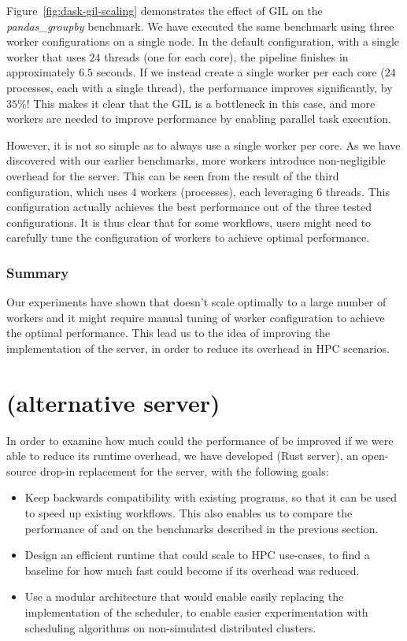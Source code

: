 Figure~\ref{fig:dask-gil-scaling} demonstrates the effect of GIL on the
\emph{pandas\_groupby} benchmark. We have executed the same benchmark using three
\dask{} worker configurations on a single node. In the default configuration,
with a single worker that uses $24$ threads (one for each core), the pipeline
finishes in approximately $6.5$ seconds. If we instead create a single worker
per each core ($24$ processes, each with a single thread), the performance
improves significantly, by $35\%$! This makes it clear that the GIL is a
bottleneck in this case, and more \dask{} workers are needed to improve
performance by enabling parallel task execution.

However, it is not so simple as to always use a single \dask{} worker per core.
As we have discovered with our earlier benchmarks, more workers introduce non-negligible overhead
for the \dask{} server. This can be seen from the result of the third
configuration, which uses $4$ \dask{} workers
(processes), each leveraging $6$ threads. This configuration actually
achieves the best performance out of the three tested configurations. It is thus clear that for
some \dask{} workflows, users might need to carefully tune the configuration of
workers to achieve optimal performance.

\subsubsection*{Summary}
Our experiments have shown that \dask{} doesn't scale optimally to a large
number of workers and it might require manual tuning of worker configuration to achieve the optimal
performance. This lead us to the idea of improving the implementation of the
\dask{} server, in order to reduce its overhead in HPC scenarios.

\section{\rsds{} (alternative \dask{} server)}
\label{sec:rsds-description}
In order to examine how much could the performance of \dask{} be improved if we
were able to reduce its runtime overhead, we have developed \rsds{} (Rust \dask{} server), an
open-source drop-in replacement for the \dask{}
server, with the following goals:

\begin{itemize}
	\item Keep backwards compatibility with existing \dask{} programs, so that it can be
	      used to speed up existing workflows. This also enables us to compare the performance of
	      \rsds{} and \dask{} on the benchmarks described in the
	      previous section.
	\item Design an efficient runtime that could scale to HPC use-cases, to find a baseline for how much fast
	      could \dask{} become if its overhead was reduced.
	\item Use a modular architecture that would enable easily replacing the implementation of the scheduler,
	      to enable easier experimentation with scheduling algorithms on non-simulated distributed clusters.
\end{itemize}

